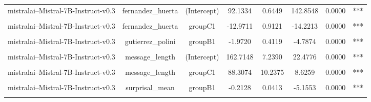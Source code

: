 \begin{table}[!h]
{\begin{tabular}{lccccccc}
mistralai--Mistral-7B-Instruct-v0.3 & fernandez_huerta & (Intercept) & 92.1334 & 0.6449 & 142.8548 & 0.0000 & ***\\
\cellcolor{gray!10}{mistralai--Mistral-7B-Instruct-v0.3} & \cellcolor{gray!10}{fernandez_huerta} & \cellcolor{gray!10}{groupB1} & \cellcolor{gray!10}{-5.5725} & \cellcolor{gray!10}{0.9121} & \cellcolor{gray!10}{-6.1096} & \cellcolor{gray!10}{0.0000} & \cellcolor{gray!10}{***}\\
mistralai--Mistral-7B-Instruct-v0.3 & fernandez_huerta & groupC1 & -12.9711 & 0.9121 & -14.2213 & 0.0000 & ***\\
\addlinespace
\cellcolor{gray!10}{mistralai--Mistral-7B-Instruct-v0.3} & \cellcolor{gray!10}{gutierrez_polini} & \cellcolor{gray!10}{(Intercept)} & \cellcolor{gray!10}{43.1317} & \cellcolor{gray!10}{0.2913} & \cellcolor{gray!10}{148.0795} & \cellcolor{gray!10}{0.0000} & \cellcolor{gray!10}{***}\\
mistralai--Mistral-7B-Instruct-v0.3 & gutierrez_polini & groupB1 & -1.9720 & 0.4119 & -4.7874 & 0.0000 & ***\\
\cellcolor{gray!10}{mistralai--Mistral-7B-Instruct-v0.3} & \cellcolor{gray!10}{gutierrez_polini} & \cellcolor{gray!10}{groupC1} & \cellcolor{gray!10}{-5.3057} & \cellcolor{gray!10}{0.4119} & \cellcolor{gray!10}{-12.8804} & \cellcolor{gray!10}{0.0000} & \cellcolor{gray!10}{***}\\
mistralai--Mistral-7B-Instruct-v0.3 & message_length & (Intercept) & 162.7148 & 7.2390 & 22.4776 & 0.0000 & ***\\
\cellcolor{gray!10}{mistralai--Mistral-7B-Instruct-v0.3} & \cellcolor{gray!10}{message_length} & \cellcolor{gray!10}{groupB1} & \cellcolor{gray!10}{55.7667} & \cellcolor{gray!10}{10.2375} & \cellcolor{gray!10}{5.4473} & \cellcolor{gray!10}{0.0000} & \cellcolor{gray!10}{***}\\
\addlinespace
mistralai--Mistral-7B-Instruct-v0.3 & message_length & groupC1 & 88.3074 & 10.2375 & 8.6259 & 0.0000 & ***\\
\cellcolor{gray!10}{mistralai--Mistral-7B-Instruct-v0.3} & \cellcolor{gray!10}{surprisal_mean} & \cellcolor{gray!10}{(Intercept)} & \cellcolor{gray!10}{1.1499} & \cellcolor{gray!10}{0.0292} & \cellcolor{gray!10}{39.3876} & \cellcolor{gray!10}{0.0000} & \cellcolor{gray!10}{***}\\
mistralai--Mistral-7B-Instruct-v0.3 & surprisal_mean & groupB1 & -0.2128 & 0.0413 & -5.1553 & 0.0000 & ***\\
\cellcolor{gray!10}{mistralai--Mistral-7B-Instruct-v0.3} & \cellcolor{gray!10}{surprisal_mean} & \cellcolor{gray!10}{groupC1} & \cellcolor{gray!10}{-0.3331} & \cellcolor{gray!10}{0.0413} & \cellcolor{gray!10}{-8.0668} & \cellcolor{gray!10}{0.0000} & \cellcolor{gray!10}{***}\\

\end{tabular}}
\end{table}
